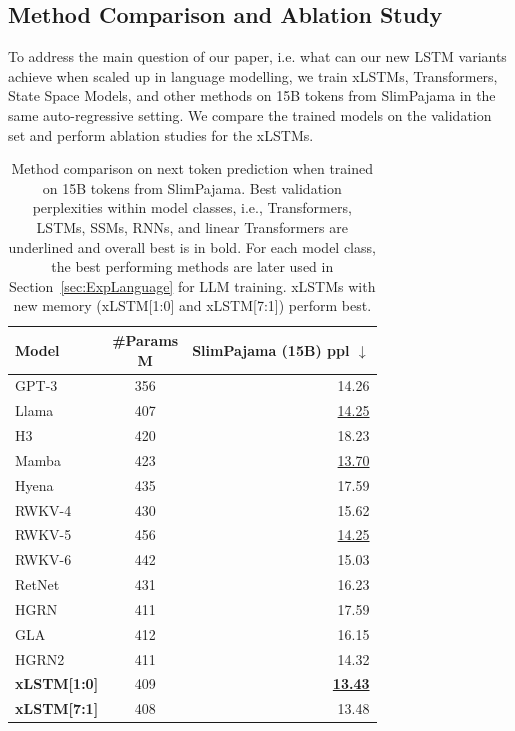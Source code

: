 \documentclass[dvipsnames]{article}
\begin{document}
\subsection{Method Comparison and Ablation Study}
\label{sec:ExpComparison}
To address the main question of our paper, i.e. what can our new LSTM variants achieve when scaled
up in language modelling, we train xLSTMs, Transformers, State Space Models, and other methods
on 15B tokens from SlimPajama in the same auto-regressive setting. We compare the trained models
on the validation set and perform ablation studies for the xLSTMs.
\begin{table}
    \vspace{-0.4cm}
    \centering
    \begin{tabular}{lcr}
    \toprule
    Model               & \thead{\#Params                              \\ M} & \thead{SlimPajama \\ (15B) ppl $\downarrow$}\\
    \midrule
    GPT-3               & 356             & 14.26                      \\
    Llama               & 407             & \underline{14.25}          \\
    \midrule
    H3                  & 420             & 18.23                      \\
    Mamba               & 423             & \underline{13.70}          \\
    \midrule
    Hyena               & 435             & 17.59                      \\
    RWKV-4              & 430             & 15.62                      \\
    RWKV-5              & 456             & \underline{14.25}          \\
    RWKV-6              & 442             & 15.03                      \\
    RetNet              & 431             & 16.23                      \\
    HGRN                & 411             & 17.59                      \\
    GLA                 & 412             & 16.15                      \\
    HGRN2               & 411             & 14.32                      \\
    \midrule
    \textbf{xLSTM[1:0]} & 409             & \underline{\textbf{13.43}} \\
    \textbf{xLSTM[7:1]} & 408             & 13.48                      \\
    \bottomrule
\end{tabular}
    \caption{Method comparison on next token prediction when trained on 15B tokens from SlimPajama. Best validation perplexities within model classes, i.e., Transformers, LSTMs,
   SSMs, RNNs, and linear Transformers are underlined
   and overall best is in bold.
   For each model class, the best performing methods are later used in Section~\ref{sec:ExpLanguage} for LLM training.
   \mbox{xLSTMs} with new memory
  (xLSTM[1:0] and \mbox{xLSTM[7:1]}) perform best. \label{tab:spaj15b_model_results}
}
\end{table}
\end{document}
